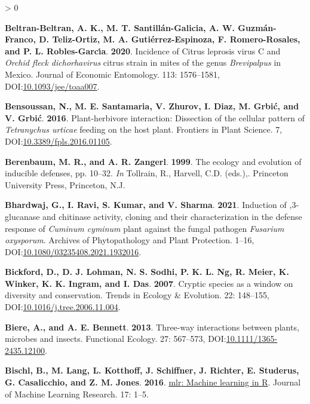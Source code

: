 \documentclass{ufdissertation}[overrideChapters] %
\newlength{\cslhangindent}
\newenvironment{CSLReferences}[2] %
 {%
  \setlength{\parindent}{0pt}
  \ifodd #1 \everypar{\setlength{\hangindent}{\cslhangindent}}\ignorespaces\fi
  \ifnum #2 > 0
  \setlength{\parskip}{#2\baselineskip}
  \fi
 }%
 {}
\begin{document}
{\begin{CSLReferences}{1}{1}
\leavevmode{}%
\textbf{Beltran-Beltran, A. K., M. T. Santillán-Galicia, A. W. Guzmán-Franco, D. Teliz-Ortiz, M. A. Gutiérrez-Espinoza, F. Romero-Rosales, and P. L. Robles-Garcı́a}. \textbf{2020}. Incidence of {Citrus leprosis virus} {C} and {\emph{Orchid fleck dichorhavirus}} citrus strain in mites of the genus {\emph{Brevipalpus}} in {Mexico}. Journal of Economic Entomology. 113: 1576--1581, DOI:\href{https://doi.org/10.1093/jee/toaa007}{10.1093/jee/toaa007}.

\leavevmode{}%
\textbf{Bensoussan, N., M. E. Santamaria, V. Zhurov, I. Diaz, M. Grbić, and V. Grbić}. \textbf{2016}. Plant-herbivore interaction: Dissection of the cellular pattern of {\emph{Tetranychus urticae}} feeding on the host plant. Frontiers in Plant Science. 7, DOI:\href{https://doi.org/10.3389/fpls.2016.01105}{10.3389/fpls.2016.01105}.

\leavevmode{}%
\textbf{Berenbaum, M. R., and A. R. Zangerl}. \textbf{1999}. The ecology and evolution of inducible defenses, pp. 10--32. \emph{In} Tollrain, R., Harvell, C.D. (eds.),. Princeton University Press, Princeton, N.J.

\leavevmode{}%
\textbf{Bhardwaj, G., I. Ravi, S. Kumar, and V. Sharma}. \textbf{2021}. Induction of ,3-glucanase and chitinase activity, cloning and their characterization in the defense response of {\emph{Cuminum cyminum}} plant against the fungal pathogen {\emph{Fusarium oxysporum}}. Archives of Phytopathology and Plant Protection. 1--16, DOI:\href{https://doi.org/10.1080/03235408.2021.1932016}{10.1080/03235408.2021.1932016}.

\leavevmode{}%
\textbf{Bickford, D., D. J. Lohman, N. S. Sodhi, P. K. L. Ng, R. Meier, K. Winker, K. K. Ingram, and I. Das}. \textbf{2007}. Cryptic species as a window on diversity and conservation. Trends in Ecology {\&} Evolution. 22: 148--155, DOI:\href{https://doi.org/10.1016/j.tree.2006.11.004}{10.1016/j.tree.2006.11.004}.

\leavevmode{}%
\textbf{Biere, A., and A. E. Bennett}. \textbf{2013}. Three-way interactions between plants, microbes and insects. Functional Ecology. 27: 567--573, DOI:\href{https://doi.org/10.1111/1365-2435.12100}{10.1111/1365-2435.12100}.

\leavevmode{}%
\textbf{Bischl, B., M. Lang, L. Kotthoff, J. Schiffner, J. Richter, E. Studerus, G. Casalicchio, and Z. M. Jones}. \textbf{2016}. \href{https://jmlr.org/papers/v17/15-066.html}{{mlr}: Machine learning in {R}}. Journal of Machine Learning Research. 17: 1--5.


\end{CSLReferences}}
\end{document}
